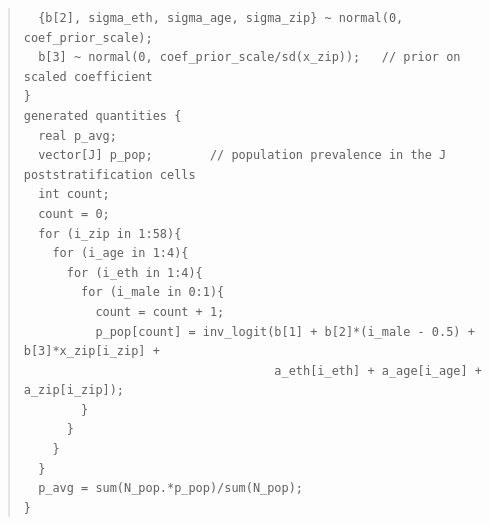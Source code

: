 \documentclass[11pt]{article}
\begin{document}
\begin{small}
\begin{quotation}
\begin{verbatim}
  {b[2], sigma_eth, sigma_age, sigma_zip} ~ normal(0, coef_prior_scale);
  b[3] ~ normal(0, coef_prior_scale/sd(x_zip));   // prior on scaled coefficient
}
generated quantities {
  real p_avg;
  vector[J] p_pop;        // population prevalence in the J poststratification cells
  int count;
  count = 0;
  for (i_zip in 1:58){
    for (i_age in 1:4){
      for (i_eth in 1:4){
        for (i_male in 0:1){
          count = count + 1;
          p_pop[count] = inv_logit(b[1] + b[2]*(i_male - 0.5) + b[3]*x_zip[i_zip] +
                                   a_eth[i_eth] + a_age[i_age] + a_zip[i_zip]);
        }
      }
    }
  }
  p_avg = sum(N_pop.*p_pop)/sum(N_pop);
}
\end{verbatim}
\end{quotation}
\end{small}
\end{document}
